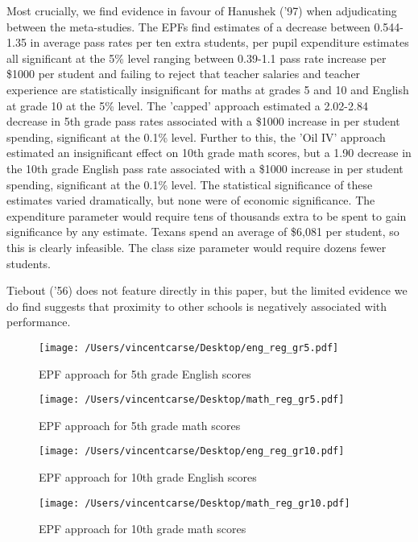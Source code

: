 \documentclass[11pt]{article}
\begin{document}
Most crucially, we find evidence in favour of Hanushek ('97) when adjudicating between the meta-studies. The EPFs find estimates of a decrease between 0.544-1.35 in average pass rates per ten extra students, per pupil expenditure estimates all significant at the 5\% level ranging between 0.39-1.1 pass rate increase per \$1000 per student and failing to reject that teacher salaries and teacher experience are statistically insignificant for maths at grades 5 and 10 and English at grade 10 at the 5\% level. The 'capped' approach estimated a 2.02-2.84 decrease in 5th grade pass rates associated with a \$1000 increase in per student spending, significant at the 0.1\% level. Further to this, the 'Oil IV' approach estimated an insignificant effect on 10th grade math scores, but a 1.90 decrease in the 10th grade English pass rate associated with a \$1000 increase in per student spending, significant at the 0.1\% level. The statistical significance of these estimates varied dramatically, but none were of economic significance. The expenditure parameter would require tens of thousands extra to be spent to gain significance by any estimate. Texans spend an average of \$6,081 per student, so this is clearly infeasible. The class size parameter would require dozens fewer students. 

Tiebout ('56) does not feature directly in this paper, but the limited evidence we do find suggests that proximity to other schools is negatively associated with performance. 

\begin{figure}
    \label{image-myimage}
    \texttt{[image: /Users/vincentcarse/Desktop/eng\_reg\_gr5.pdf]}
    \caption{EPF approach for 5th grade English scores}
\end{figure}

\begin{figure}
    \label{image-myimage}
    \texttt{[image: /Users/vincentcarse/Desktop/math\_reg\_gr5.pdf]}
    \caption{EPF approach for 5th grade math scores}
\end{figure}



\begin{figure}
    \label{image-myimage}
    \texttt{[image: /Users/vincentcarse/Desktop/eng\_reg\_gr10.pdf]}
    \caption{EPF approach for 10th grade English scores}
\end{figure}

\begin{figure}
    \label{image-myimage}
    \texttt{[image: /Users/vincentcarse/Desktop/math\_reg\_gr10.pdf]}
    \caption{EPF approach for 10th grade math scores}
\end{figure}
\end{document}
